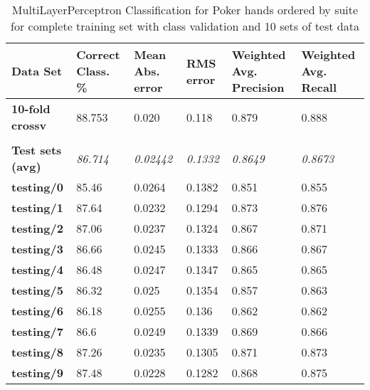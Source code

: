 \documentclass[10pt, a4paper]{article}
\begin{document}
\begin{table}[htbp]
  \centering
  \begin{tabular}{p{3cm}p{1.5cm}p{1.5cm}p{1.5cm}p{1.5cm}p{1.5cm}}
    \toprule
    \textbf{Data Set} & Correct Class. \% & Mean Abs. error & RMS error & Weighted Avg. Precision & Weighted Avg. Recall \\
    \midrule
    \textbf{10-fold crossv} & 88.753 & 0.020 & 0.118 & 0.879 & 0.888 \\
    \textbf{} &       &       &       &       &  \\
    \textbf{Test sets (avg)} & \textit{86.714} & \textit{0.02442} & \textit{0.1332} & \textit{0.8649} & \textit{0.8673} \\
    \textbf{   testing/0} & 85.46 & 0.0264 & 0.1382 & 0.851 & 0.855 \\
    \textbf{   testing/1} & 87.64 & 0.0232 & 0.1294 & 0.873 & 0.876 \\
    \textbf{   testing/2} & 87.06 & 0.0237 & 0.1324 & 0.867 & 0.871 \\
    \textbf{   testing/3} & 86.66 & 0.0245 & 0.1333 & 0.866 & 0.867 \\
    \textbf{   testing/4} & 86.48 & 0.0247 & 0.1347 & 0.865 & 0.865 \\
    \textbf{   testing/5} & 86.32 & 0.025 & 0.1354 & 0.857 & 0.863 \\
    \textbf{   testing/6} & 86.18 & 0.0255 & 0.136 & 0.862 & 0.862 \\
    \textbf{   testing/7} & 86.6  & 0.0249 & 0.1339 & 0.869 & 0.866 \\
    \textbf{   testing/8} & 87.26 & 0.0235 & 0.1305 & 0.871 & 0.873 \\
    \textbf{   testing/9} & 87.48 & 0.0228 & 0.1282 & 0.868 & 0.875 \\
    \bottomrule
    \end{tabular}%

	\caption{MultiLayerPerceptron Classification for Poker hands ordered by suite for complete training set with class validation and 10 sets of test data}   
  \label{tab:nnosresults}%
\end{table}%
\end{document}
